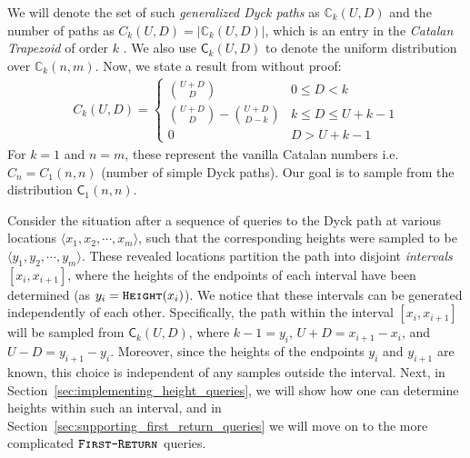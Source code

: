 We will denote the set of such \emph{generalized Dyck paths} as $\mathbb C_k(U,D)$ and the number of paths as $C_k(U,D) = |\mathbb C_k(U,D)|$,
which is an entry in the \textit{Catalan Trapezoid} of order $k$ \cite{trap}.
We also use $\mathsf C_k(U,D)$ to denote the uniform distribution over $\mathbb C_k(n,m)$.
Now, we state a result from \cite{trap} without proof:
\begin{align}
    \label{eq:catalan_trapezoid}
    C_k(U,D)=
    \begin{cases}
    \binom{U+D}{D} &0\le D<k\\
    \binom{U+D}{D} - \binom{U+D}{D-k} &k\le D\le U+k-1\\
    0 &D>U+k-1
    \end{cases}
\end{align}
For $k = 1$ and $n=m$, these represent the vanilla Catalan numbers i.e. $C_n = C_1(n,n)$ (number of simple Dyck paths).
Our goal is to sample from the distribution $\mathsf C_1(n,n)$.

Consider the situation after a sequence of  queries to the Dyck path at various locations $\langle x_1, x_2,\cdots, x_m \rangle$,
such that the corresponding heights were sampled to be $ \langle y_1, y_2,\cdots, y_m \rangle$.
These revealed locations partition the path into disjoint \emph{intervals} $[x_i,x_{i+1}]$,
where the heights of the endpoints of each interval have been determined (as $y_i = \texttt{\textsc{Height}}(x_i)$).
We notice that these intervals can be generated independently of each other.
Specifically, the path within the interval $[x_i, x_{i+1}]$ will be sampled from $\mathsf C_k(U,D)$,
where $k - 1 = y_i$, $U + D = x_{i+1} - x_i$, and $U-D = y_{i+1} - y_i$.
Moreover, since the heights of the endpoints $y_i$ and $y_{i+1}$ are known, this choice is independent of any samples outside the interval.
Next, in Section~\ref{sec:implementing_height_queries}, we will show how one can determine heights within such an interval,
and in Section~\ref{sec:supporting_first_return_queries} we will move on to the more complicated $\texttt{\textsc{First-Return}}$ queries.




